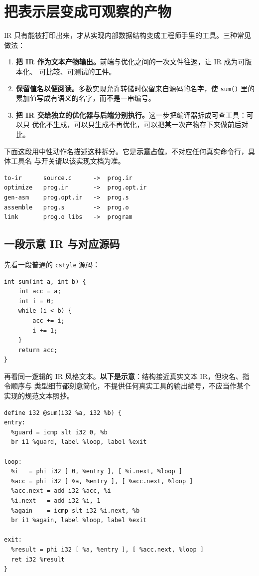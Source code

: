 \documentclass[12pt,a4paper,fontset=fandol]{ctexbook}
\newcommand{\Fn}[1]{\texttt{#1()}}
\newcommand{\Tp}[1]{\texttt{#1}}
\begin{document}
\section{把表示层变成可观察的产物}\label{sec:cl04-observe}

IR 只有能被打印出来，才从实现内部数据结构变成工程师手里的工具。三种常见做法：

\begin{enumerate}
  \item \textbf{把 IR 作为文本产物输出。}前端与优化之间的一次文件往返，让 IR 成为可版本化、
        可比较、可测试的工件。
  \item \textbf{保留值名以便阅读。}多数实现允许转储时保留来自源码的名字，使 \Fn{sum} 里的
        累加值写成有语义的名字，而不是一串编号。
  \item \textbf{把 IR 交给独立的优化器与后端分别执行。}这一步把编译器拆成可查工具：可以只
        优化不生成，可以只生成不再优化，可以把某一次产物存下来做前后对比。
\end{enumerate}

下面这段用中性动作名描述这种拆分。它是\textbf{示意占位}，不对应任何真实命令行，具体工具名
与开关请以该实现文档为准。

\begin{lstlisting}[style=shellstyle]
to-ir      source.c      ->  prog.ir
optimize   prog.ir       ->  prog.opt.ir
gen-asm    prog.opt.ir   ->  prog.s
assemble   prog.s        ->  prog.o
link       prog.o libs   ->  program
\end{lstlisting}

\subsection{一段示意 IR 与对应源码}\label{sec:cl04-observe-sample}

先看一段普通的 \Tp{cstyle} 源码：

\begin{lstlisting}[style=cstyle]
int sum(int a, int b) {
    int acc = a;
    int i = 0;
    while (i < b) {
        acc += i;
        i += 1;
    }
    return acc;
}
\end{lstlisting}

再看同一逻辑的 IR 风格文本。\textbf{以下是示意}：结构接近真实文本 IR，但块名、指令顺序与
类型细节都刻意简化，不提供任何真实工具的输出编号，不应当作某个实现的规范文本照抄。

\begin{lstlisting}[style=outstyle]
define i32 @sum(i32 %a, i32 %b) {
entry:
  %guard = icmp slt i32 0, %b
  br i1 %guard, label %loop, label %exit

loop:
  %i   = phi i32 [ 0, %entry ], [ %i.next, %loop ]
  %acc = phi i32 [ %a, %entry ], [ %acc.next, %loop ]
  %acc.next = add i32 %acc, %i
  %i.next   = add i32 %i, 1
  %again    = icmp slt i32 %i.next, %b
  br i1 %again, label %loop, label %exit

exit:
  %result = phi i32 [ %a, %entry ], [ %acc.next, %loop ]
  ret i32 %result
}
\end{lstlisting}
\end{document}
